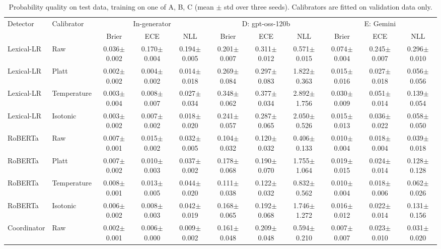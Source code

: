 \begin{table}[t]
\centering
\scriptsize\setlength{\tabcolsep}{2.5pt}
\caption{Probability quality on test data, training on one of A, B, C (mean $\pm$ std over three seeds). Calibrators are fitted on validation data only.}
\label{tab:calibration}
\begin{tabular}{@{}ll@{\ }ccccccccc@{}}
\toprule
Detector & Calibrator & \multicolumn{3}{c}{In-generator} & \multicolumn{3}{c}{D: gpt-oss-120b} & \multicolumn{3}{c}{E: Gemini} \\
 & & Brier & ECE & NLL & Brier & ECE & NLL & Brier & ECE & NLL \\
\midrule
Lexical-LR & Raw & 0.036$\pm$0.002 & 0.170$\pm$0.004 & 0.194$\pm$0.005 & 0.201$\pm$0.007 & 0.311$\pm$0.012 & 0.571$\pm$0.015 & 0.074$\pm$0.004 & 0.245$\pm$0.007 & 0.296$\pm$0.010 \\
Lexical-LR & Platt & 0.002$\pm$0.002 & 0.004$\pm$0.002 & 0.014$\pm$0.018 & 0.269$\pm$0.084 & 0.297$\pm$0.083 & 1.822$\pm$0.363 & 0.015$\pm$0.016 & 0.027$\pm$0.018 & 0.056$\pm$0.056 \\
Lexical-LR & Temperature & 0.003$\pm$0.004 & 0.008$\pm$0.007 & 0.027$\pm$0.034 & 0.348$\pm$0.062 & 0.377$\pm$0.034 & 2.892$\pm$1.756 & 0.030$\pm$0.009 & 0.051$\pm$0.014 & 0.139$\pm$0.054 \\
Lexical-LR & Isotonic & 0.003$\pm$0.002 & 0.007$\pm$0.002 & 0.018$\pm$0.020 & 0.241$\pm$0.057 & 0.287$\pm$0.065 & 2.050$\pm$0.526 & 0.015$\pm$0.013 & 0.036$\pm$0.022 & 0.058$\pm$0.050 \\
RoBERTa & Raw & 0.007$\pm$0.001 & 0.015$\pm$0.002 & 0.032$\pm$0.005 & 0.104$\pm$0.032 & 0.120$\pm$0.032 & 0.406$\pm$0.133 & 0.010$\pm$0.004 & 0.018$\pm$0.004 & 0.039$\pm$0.018 \\
RoBERTa & Platt & 0.007$\pm$0.002 & 0.010$\pm$0.003 & 0.037$\pm$0.002 & 0.178$\pm$0.068 & 0.190$\pm$0.070 & 1.755$\pm$1.064 & 0.019$\pm$0.015 & 0.024$\pm$0.014 & 0.128$\pm$0.128 \\
RoBERTa & Temperature & 0.008$\pm$0.001 & 0.013$\pm$0.005 & 0.044$\pm$0.020 & 0.111$\pm$0.038 & 0.122$\pm$0.032 & 0.832$\pm$0.562 & 0.010$\pm$0.004 & 0.018$\pm$0.006 & 0.062$\pm$0.026 \\
RoBERTa & Isotonic & 0.006$\pm$0.002 & 0.008$\pm$0.003 & 0.042$\pm$0.019 & 0.168$\pm$0.065 & 0.192$\pm$0.068 & 1.746$\pm$1.272 & 0.016$\pm$0.012 & 0.022$\pm$0.014 & 0.131$\pm$0.156 \\
Coordinator & Raw & 0.002$\pm$0.001 & 0.006$\pm$0.000 & 0.009$\pm$0.002 & 0.161$\pm$0.048 & 0.209$\pm$0.048 & 0.594$\pm$0.210 & 0.007$\pm$0.007 & 0.023$\pm$0.010 & 0.031$\pm$0.020 \\

\end{tabular}
\end{table}
